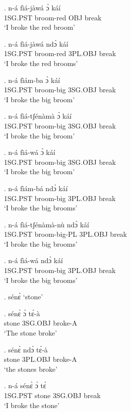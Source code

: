 \documentclass{assets/fieldnotes}
\begin{document}
{\exg. n-á fìá-jàwá ɔ̀ káí\\
1SG.PST broom-red OBJ break\\
`I broke the red broom'

\exg. n-á fìá-jàwá ndɔ̀ káí\\
1SG.PST broom-red 3PL.OBJ break\\
`I broke the red brooms'

\exg. n-á fìám-ba ɔ̀ káí\\
1SG.PST broom-big 3SG.OBJ break\\
`I broke the big broom'

\exg. n-á fìá-tʃénàmà ɔ̀ káí\\
1SG.PST broom-big 3SG.OBJ break\\
`I broke the big broom'

\exg. n-á fìá-wá ɔ̀ káí\\
1SG.PST broom-big 3SG.OBJ break\\
`I broke the big broom'

\exg.  n-á fìám-bá ndɔ̀ káí\\
 1SG.PST broom-big 3PL.OBJ break\\
`I broke the big brooms'

\exg.  n-á fìá-tʃénàmà-nù ndɔ̀ káí\\
 1SG.PST broom-big-PL 3PL.OBJ break\\
`I broke the big brooms'


\exg.  n-á fìá-wá ndɔ̀ káí\\
 1SG.PST broom-big 3PL.OBJ break\\
`I broke the big brooms'

\ex. sénɛ̀
`stone'



\exg. sénɛ̀ ɔ̀ tɛ́-à\\
stone 3SG.OBJ broke-A\\
`The stone broke'

\exg. sénɛ̀ ndɔ̀ tɛ́-à\\
stone 3PL.OBJ broke-A\\
`the stones broke'

\exg. n-á sénɛ̀ ɔ̀ tɛ́\\
1SG.PST stone 3SG.OBJ break\\
`I broke the stone'

}
\end{document}
